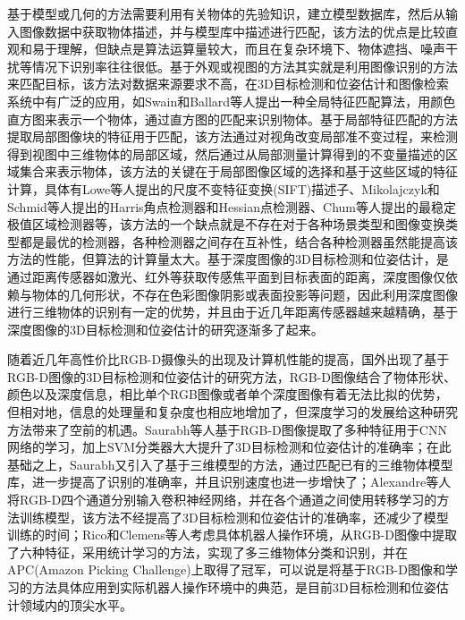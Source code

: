 基于模型或几何的方法需要利用有关物体的先验知识，建立模型数据库，然后从输入图像数据中获取物体描述，并与模型库中描述进行匹配，该方法的优点是比较直观和易于理解，但缺点是算法运算量较大，而且在复杂环境下、物体遮挡、噪声干扰等情况下识别率往往很低。基于外观或视图的方法其实就是利用图像识别的方法来匹配目标，该方法对数据来源要求不高，在3D目标检测和位姿估计和图像检索系统中有广泛的应用，如Swain和Ballard等人提出一种全局特征匹配算法\cite{swain1991color}，用颜色直方图来表示一个物体，通过直方图的匹配来识别物体。基于局部特征匹配的方法提取局部图像块的特征用于匹配，该方法通过对视角改变局部准不变过程，来检测得到视图中三维物体的局部区域，然后通过从局部测量计算得到的不变量描述的区域集合来表示物体，该方法的关键在于局部图像区域的选择和基于这些区域的特征计算，具体有Lowe等人提出的尺度不变特征变换(SIFT)描述子\cite{lowe1999object}、Mikolajczyk和Schmid等人提出的Harris角点检测器和Hessian点检测器\cite{matas2004robust}、Chum等人提出的最稳定极值区域检测器\cite{chum2004enhancing}等，该方法的一个缺点就是不存在对于各种场景类型和图像变换类型都是最优的检测器，各种检测器之间存在互补性，结合各种检测器虽然能提高该方法的性能，但算法的计算量太大。基于深度图像的3D目标检测和位姿估计，是通过距离传感器如激光、红外等获取传感焦平面到目标表面的距离，深度图像仅依赖与物体的几何形状，不存在色彩图像阴影或表面投影等问题，因此利用深度图像进行三维物体的识别有一定的优势，并且由于近几年距离传感器越来越精确，基于深度图像的3D目标检测和位姿估计的研究逐渐多了起来。

随着近几年高性价比RGB-D摄像头的出现及计算机性能的提高，国外出现了基于RGB-D图像的3D目标检测和位姿估计的研究方法，RGB-D图像结合了物体形状、颜色以及深度信息，相比单个RGB图像或者单个深度图像有着无法比拟的优势，但相对地，信息的处理量和复杂度也相应地增加了，但深度学习的发展给这种研究方法带来了空前的机遇。Saurabh等人基于RGB-D图像提取了多种特征用于CNN网络的学习，加上SVM分类器大大提升了3D目标检测和位姿估计的准确率\cite{Gupta2014}；在此基础之上，Saurabh又引入了基于三维模型的方法，通过匹配已有的三维物体模型库，进一步提高了识别的准确率，并且识别速度也进一步增快了\cite{Gupta2013}；Alexandre等人将RGB-D四个通道分别输入卷积神经网络，并在各个通道之间使用转移学习的方法训练模型，该方法不经提高了3D目标检测和位姿估计的准确率，还减少了模型训练的时间\cite{alexandre20163d}；Rico和Clemens等人考虑具体机器人操作环境，从RGB-D图像中提取了六种特征，采用统计学习的方法，实现了多三维物体分类和识别\cite{jonschkowski2016probabilistic}，并在APC(Amazon Picking Challenge)上取得了冠军，可以说是将基于RGB-D图像和学习的方法具体应用到实际机器人操作环境中的典范，是目前3D目标检测和位姿估计领域内的顶尖水平。

